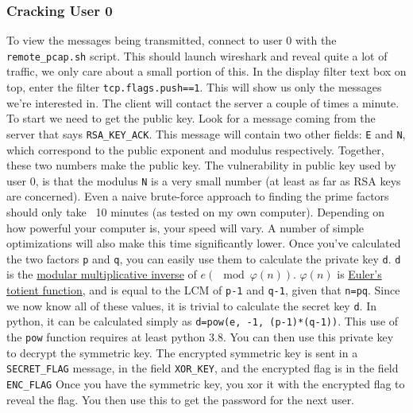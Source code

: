 {                        \subsubsection*{Cracking User 0}
                            To view the messages being transmitted, connect to user 0 with the \lstinline`remote_pcap.sh` script. 
                            This should launch wireshark and reveal quite a lot of traffic, we only care about a small portion of this.
                            In the display filter text box on top, enter the filter \lstinline`tcp.flags.push==1`. 
                            This will show us only the messages we're interested in.
                            The client will contact the server a couple of times a minute.
                            To start we need to get the public key. 
                            Look for a message coming from the server that says \lstinline`RSA_KEY_ACK`. 
                            This message will contain two other fields: \lstinline`E` and \lstinline`N`, which correspond to the public exponent and modulus respectively.
                            Together, these two numbers make the public key.
                            The vulnerability in public key used by user 0, is that the modulus \lstinline`N` is a very small number (at least as far as RSA keys are concerned). 
                            Even a naive brute-force approach to finding the prime factors should only take ~10 minutes (as tested on my own computer). 
                            Depending on how powerful your computer is, your speed will vary. 
                            A number of simple optimizations will also make this time significantly lower. 
                            Once you've calculated the two factors \lstinline`p` and \lstinline`q`, you can easily use them to calculate the private key \lstinline`d`. 
                            \lstinline`d` is the \href{https://en.wikipedia.org/wiki/Modular_multiplicative_inverse}{modular multiplicative inverse} of $e (\mod{\varphi(n)})$. 
                            $\varphi(n)$ is \href{https://en.wikipedia.org/wiki/Euler%27s_totient_function}{Euler's totient function}, and is equal to the LCM of \lstinline`p-1` and \lstinline`q-1`, given that \lstinline`n=pq`.
                            Since we now know all of these values, it is trivial to calculate the secret key \lstinline`d`.
                            In python, it can be calculated simply as \lstinline`d=pow(e, -1, (p-1)*(q-1))`.
                            This use of the \lstinline`pow` function requires at least python 3.8.
                            You can then use this private key to decrypt the symmetric key. 
                            The encrypted symmetric key is sent in a \lstinline`SECRET_FLAG` message, in the field \lstinline`XOR_KEY`, and the encrypted flag is in the field \lstinline`ENC_FLAG`
                            Once you have the symmetric key, you xor it with the encrypted flag to reveal the flag. 
                            You then use this to get the password for the next user.
}
